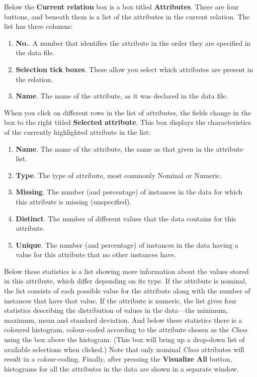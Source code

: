 \documentclass[a4paper]{article}
\begin{document}
Below the \textbf{Current relation} box is a box titled \textbf{Attributes}.
There are four buttons, and beneath them is a list of the attributes in the
current relation. The list has three columns:

\begin{enumerate}
\item \textbf{No.}.
A number that identifies the attribute in the order they are specified in the
data file. 
\item \textbf{Selection tick boxes}.
These allow you select which attributes are present in the relation.
\item \textbf{Name}.
The name of the attribute, as it was declared in the data file.
\end{enumerate}

When you click on different rows in the list of attributes, the fields
change in the box to the right titled \textbf{Selected
attribute}. This box displays the characteristics of the currently
highlighted attribute in the list:

\begin{enumerate}
\item \textbf{Name}.
The name of the attribute, the same as that given in the attribute list.
\item \textbf{Type}.
The type of attribute, most commonly Nominal or Numeric.
\item \textbf{Missing}.
The number (and percentage) of instances in the data for which this attribute
is missing (unspecified).
\item \textbf{Distinct}.
The number of different values that the data contains for this attribute.
\item \textbf{Unique}.
The number (and percentage) of instances in the data having a value for this
attribute that no other instances have.
\end{enumerate}
\noindent
Below these statistics is a list showing more information about the
values stored in this attribute, which differ depending on its type.
If the attribute is nominal, the list consists of each possible value
for the attribute along with the number of instances that have that
value.  If the attribute is numeric, the list gives four statistics
describing the distribution of values in the data---the minimum,
maximum, mean and standard deviation.  And below these statistics
there is a coloured histogram, colour-coded according to the attribute
chosen as the {\it Class} using the box above the histogram. (This box
will bring up a drop-down list of available selections when clicked.)
Note that only nominal {\it Class} attributes will result in a
colour-coding.  Finally, after pressing the \textbf{Visualize All}
button, histograms for all the attributes in the data are shown in a
separate window.
\end{document}
